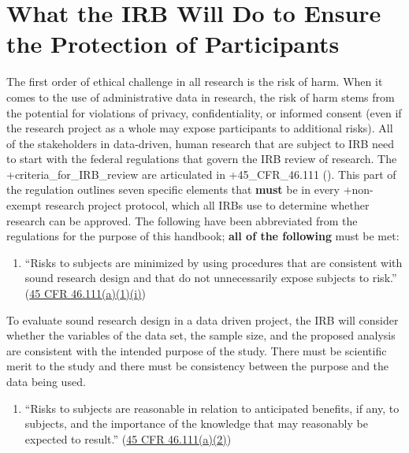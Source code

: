 \documentclass[
]{book}
\providecommand{\tightlist}{%
  \setlength{\itemsep}{0pt}\setlength{\parskip}{0pt}}
\begin{document}
\hypertarget{what-the-irb-will-do-to-ensure-the-protection-of-participants}{%
\section{What the IRB Will Do to Ensure the Protection of Participants}\label{what-the-irb-will-do-to-ensure-the-protection-of-participants}}

The first order of ethical challenge in all research is the risk of harm. When it comes to the use of administrative data in research, the risk of harm stems from the potential for violations of privacy, confidentiality, or informed consent (even if the research project as a whole may expose participants to additional risks). All of the stakeholders in data-driven, human research that are subject to IRB need to start with the federal regulations that govern the IRB review of research. The +criteria\_for\_IRB\_review\textbar{} are articulated in +45\_CFR\_46.111\textbar{} (\citet{codeoffederalregulations2017}). This part of the regulation outlines seven specific elements that \textbf{must} be in every +non-exempt\textbar{} research project protocol, which all IRBs use to determine whether research can be approved. The following have been abbreviated from the regulations for the purpose of this handbook; \textbf{all of the following} must be met:

\begin{enumerate}
\def\labelenumi{(\arabic{enumi})}
\tightlist
\item
  ``Risks to subjects are minimized by using procedures that are consistent with sound research design and that do not unnecessarily expose subjects to risk.'' (\href{https://www.law.cornell.edu/cfr/text/45/46.111}{45 CFR 46.111(a)(1)(i)})
\end{enumerate}

To evaluate sound research design in a data driven project, the IRB will consider whether the variables of the data set, the sample size, and the proposed analysis are consistent with the intended purpose of the study. There must be scientific merit to the study and there must be consistency between the purpose and the data being used.

\begin{enumerate}
\def\labelenumi{(\arabic{enumi})}
\setcounter{enumi}{1}
\tightlist
\item
  ``Risks to subjects are reasonable in relation to anticipated benefits, if any, to subjects, and the importance of the knowledge that may reasonably be expected to result.'' (\href{https://www.law.cornell.edu/cfr/text/45/46.111}{45 CFR 46.111(a)(2)})
\end{enumerate}
\end{document}

